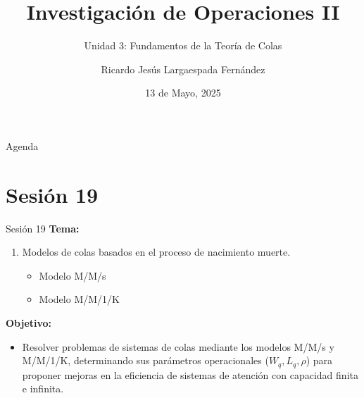 \documentclass{beamer}
\title{Investigación de Operaciones II}
\subtitle{Unidad 3: Fundamentos de la Teoría de Colas}
\author[RL]{Ricardo Jesús Largaespada Fernández}
\institute[UNI]{Ingeniería de Sistemas, DACTIC, UNI}
\date{13 de Mayo, 2025}
\begin{document}
\frame{\titlepage}

\begin{frame}{Agenda}
    \tableofcontents
\end{frame}

\section{Sesión 19}

\begin{frame}{Sesión 19}
\textbf{Tema:}
\begin{enumerate}
    \item Modelos de colas basados en el proceso de nacimiento muerte.
    \begin{itemize}
        \item Modelo M/M/s
        \item Modelo M/M/1/K
    \end{itemize}
\end{enumerate}

\textbf{Objetivo:}
\begin{itemize}
    \item Resolver problemas de sistemas de colas mediante los modelos M/M/s y M/M/1/K, determinando sus parámetros operacionales ($W_q, L_q, \rho$) para proponer mejoras en la eficiencia de sistemas de atención con capacidad finita e infinita.
\end{itemize}
\end{frame}
\end{document}
